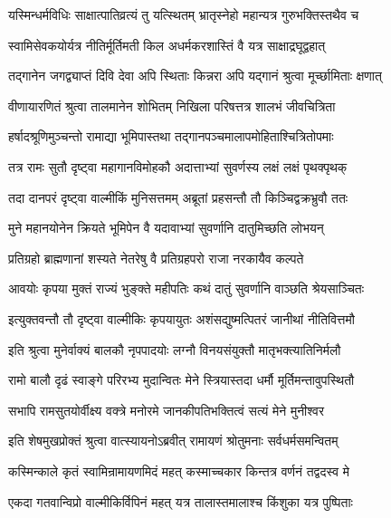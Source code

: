 \twolineshloka
{यस्मिन्धर्मविधिः साक्षात्पातिव्रत्यं तु यत्स्थितम्}
{भ्रातृस्नेहो महान्यत्र गुरुभक्तिस्तथैव च}%

\twolineshloka
{स्वामिसेवकयोर्यत्र नीतिर्मूर्तिमती किल}
{अधर्मकरशास्तिं वै यत्र साक्षाद्रघूद्वहात्}%

\twolineshloka
{तद्गानेन जगद्व्याप्तं दिवि देवा अपि स्थिताः}
{किन्नरा अपि यद्गानं श्रुत्वा मूर्च्छामिताः क्षणात्}%

\twolineshloka
{वीणायारणितं श्रुत्वा तालमानेन शोभितम्}
{निखिला परिषत्तत्र शालभं जीवचित्रिता}%

\twolineshloka
{हर्षादश्रूणिमुञ्चन्तो रामाद्या भूमिपास्तथा}
{तद्गानपञ्चमालापमोहिताश्चित्रितोपमाः}%

\twolineshloka
{तत्र रामः सुतौ दृष्ट्वा महागानविमोहकौ}
{अदात्ताभ्यां सुवर्णस्य लक्षं लक्षं पृथक्पृथक्}%

\twolineshloka
{तदा दानपरं दृष्ट्वा वाल्मीकिं मुनिसत्तमम्}
{अब्रूतां प्रहसन्तौ तौ किञ्चिद्वक्रभ्रुवौ ततः}%

\twolineshloka
{मुने महानयोनेन क्रियते भूमिपेन वै}
{यदावाभ्यां सुवर्णानि दातुमिच्छति लोभयन्}%

\twolineshloka
{प्रतिग्रहो ब्राह्मणानां शस्यते नेतरेषु वै}
{प्रतिग्रहपरो राजा नरकायैव कल्पते}%

\twolineshloka
{आवयोः कृपया मुक्तं राज्यं भुङ्क्ते महीपतिः}
{कथं दातुं सुवर्णानि वाञ्छति श्रेयसाञ्चितः}%

\twolineshloka
{इत्युक्तवन्तौ तौ दृष्ट्वा वाल्मीकिः कृपयायुतः}
{अशंसद्युष्मत्पितरं जानीथां नीतिवित्तमौ}%

\twolineshloka
{इति श्रुत्वा मुनेर्वाक्यं बालकौ नृपपादयोः}
{लग्नौ विनयसंयुक्तौ मातृभक्त्यातिनिर्मलौ}%

\twolineshloka
{रामो बालौ दृढं स्वाङ्गे परिरभ्य मुदान्वितः}
{मेने स्त्रियास्तदा धर्मौ मूर्तिमन्तावुपस्थितौ}%

\twolineshloka
{सभापि रामसुतयोर्वीक्ष्य वक्त्रे मनोरमे}
{जानकीपतिभक्तित्वं सत्यं मेने मुनीश्वर}%

\twolineshloka
{इति शेषमुखप्रोक्तं श्रुत्वा वात्स्यायनोऽब्रवीत्}
{रामायणं श्रोतुमनाः सर्वधर्मसमन्वितम्}%


\twolineshloka
{कस्मिन्काले कृतं स्वामिन्रामायणमिदं महत्}
{कस्माच्चकार किन्तत्र वर्णनं तद्वदस्व मे}%


\twolineshloka
{एकदा गतवान्विप्रो वाल्मीकिर्विपिनं महत्}
{यत्र तालास्तमालाश्च किंशुका यत्र पुष्पिताः}%


